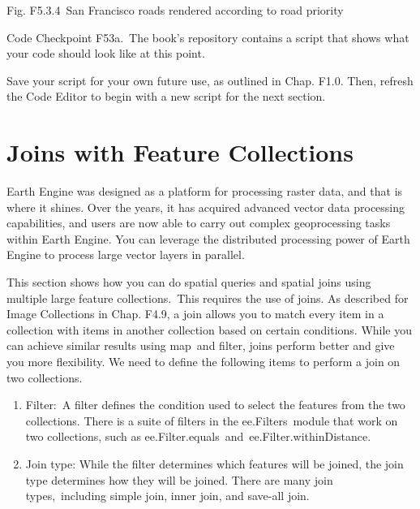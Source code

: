 \documentclass[
  letterpaper,
  DIV=11,
  numbers=noendperiod]{scrreprt}
\providecommand{\tightlist}{%
  \setlength{\itemsep}{0pt}\setlength{\parskip}{0pt}}\usepackage{longtable,booktabs,array}
\begin{document}
Fig. F5.3.4~San Francisco roads rendered according to road priority

\begin{tcolorbox}[enhanced jigsaw, left=2mm, breakable, rightrule=.15mm, opacityback=0, colframe=quarto-callout-note-color-frame, colbacktitle=quarto-callout-note-color!10!white, arc=.35mm, opacitybacktitle=0.6, toptitle=1mm, colback=white, leftrule=.75mm, title=\textcolor{quarto-callout-note-color}{\faInfo}\hspace{0.5em}{Note}, toprule=.15mm, bottomtitle=1mm, titlerule=0mm, bottomrule=.15mm, coltitle=black]

Code Checkpoint F53a.~The book's repository contains a script that shows
what your code should look like at this point.

\end{tcolorbox}

Save your script for your own future use, as outlined in Chap. F1.0.
Then, refresh the Code Editor to begin with a new script for the next
section.

\hypertarget{joins-with-feature-collections}{%
\section{Joins with Feature
Collections}\label{joins-with-feature-collections}}

Earth Engine was designed as a platform for processing raster data, and
that is where it shines. Over the years, it has acquired advanced vector
data processing capabilities, and users are now able to carry out
complex geoprocessing tasks within Earth Engine. You can leverage the
distributed processing power of Earth Engine to process large vector
layers in parallel.

This section shows how you can do spatial queries and spatial joins
using multiple large feature collections.~This requires the use of
joins. As described for Image Collections in Chap. F4.9, a join allows
you to match every item in a collection with items in another collection
based on certain conditions. While you can achieve similar results using
map~and filter, joins perform better and give you more flexibility. We
need to define the following items to perform a join on two collections.

\begin{enumerate}
\def\labelenumi{\arabic{enumi}.}
\tightlist
\item
  Filter:~A filter defines the condition used to select the features
  from the two collections. There is a suite of filters in the
  ee.Filters~module that work on two collections, such as
  ee.Filter.equals~and~ee.Filter.withinDistance.
\item
  Join type: While the filter determines which features will be joined,
  the join type determines how they will be joined. There are many join
  types,~including simple join, inner join, and save-all join.
\end{enumerate}
\end{document}
